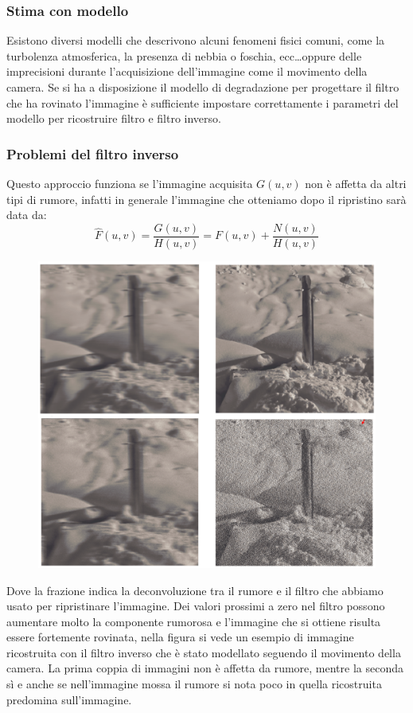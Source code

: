 \subsubsection{Stima con modello}
Esistono diversi modelli che descrivono alcuni fenomeni fisici comuni, come la turbolenza atmosferica, la presenza di nebbia o foschia, ecc\dots oppure delle imprecisioni durante l'acquisizione dell'immagine come il movimento della camera. Se si ha a disposizione il modello di degradazione per progettare il filtro che ha rovinato l'immagine è sufficiente impostare correttamente i parametri del modello per ricostruire filtro e filtro inverso.

\subsubsection{Problemi del filtro inverso}
Questo approccio funziona se l'immagine acquisita $G(u,v)$ non è affetta da altri tipi di rumore, infatti in generale l'immagine che otteniamo dopo il ripristino sarà data da:
\begin{equation}
	\hat{F}(u,v) = \frac{G(u,v)}{H(u,v)} = F(u,v) + \frac{N(u,v)}{H(u,v)}
\end{equation}
\begin{figure}
	\centering
	\includegraphics[width=.95\linewidth]{Picture/Inverse_Filter}
\end{figure}
Dove la frazione indica la deconvoluzione tra il rumore e il filtro che abbiamo usato per ripristinare l'immagine. Dei valori prossimi a zero nel filtro possono aumentare molto la componente rumorosa e l'immagine che si ottiene risulta essere fortemente rovinata, nella figura si vede un esempio di immagine ricostruita con il filtro inverso che è stato modellato seguendo il movimento della camera. La prima coppia di immagini non è affetta da rumore, mentre la seconda sì e anche se nell'immagine mossa il rumore si nota poco in quella ricostruita predomina sull'immagine.

